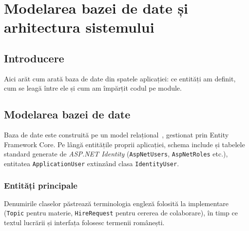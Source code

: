 \chapter{Modelarea bazei de date și arhitectura sistemului}

\section{Introducere}

Aici arăt cum arată baza de date din spatele aplicației: ce entități am definit,
cum se leagă între ele și cum am împărțit codul pe module.

\section{Modelarea bazei de date}

Baza de date este construită pe un model relațional~\cite{elmasri-navathe},
gestionat prin Entity Framework Core. Pe lângă entitățile proprii aplicației, schema
include și tabelele standard generate de \emph{ASP.NET Identity}
(\texttt{AspNetUsers}, \texttt{AspNetRoles} etc.), entitatea \texttt{ApplicationUser}
extinzând clasa \texttt{IdentityUser}.

\subsection{Entități principale}

Denumirile claselor păstrează terminologia engleză folosită la implementare
(\texttt{Topic} pentru materie, \texttt{HireRequest} pentru cererea de colaborare),
în timp ce textul lucrării și interfața folosesc termenii românești.


